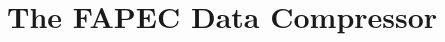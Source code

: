 \chapter{The FAPEC Data Compressor}
\begin{comment}
En aquest capítol faré una explicació teòrica del FAPEC. Tota la informació que donaré ja està publicada en papers \parencite{PaperFAPEC} o a la patent americana de FAPEC \parencite{PatentFAPEC}. D'aquesta manera no hi ha problemes de confidencialitat i el TFG podrà ser públic.
\end{comment}